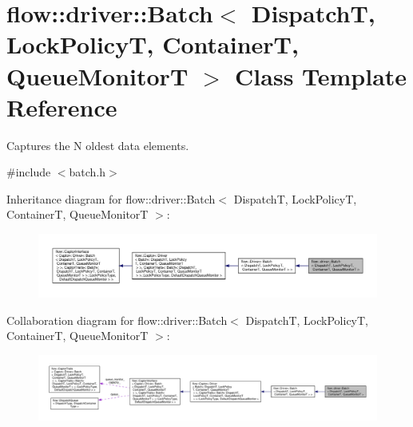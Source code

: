 \hypertarget{classflow_1_1driver_1_1_batch}{}\section{flow\+:\+:driver\+:\+:Batch$<$ DispatchT, Lock\+PolicyT, ContainerT, Queue\+MonitorT $>$ Class Template Reference}
\label{classflow_1_1driver_1_1_batch}


Captures the N oldest data elements.  




{\ttfamily \#include $<$batch.\+h$>$}



Inheritance diagram for flow\+:\+:driver\+:\+:Batch$<$ DispatchT, Lock\+PolicyT, ContainerT, Queue\+MonitorT $>$\+:
\nopagebreak
\begin{figure}[H]
\begin{center}
\leavevmode
\includegraphics[width=350pt]{classflow_1_1driver_1_1_batch__inherit__graph}
\end{center}
\end{figure}


Collaboration diagram for flow\+:\+:driver\+:\+:Batch$<$ DispatchT, Lock\+PolicyT, ContainerT, Queue\+MonitorT $>$\+:
\nopagebreak
\begin{figure}[H]
\begin{center}
\leavevmode
\includegraphics[width=350pt]{classflow_1_1driver_1_1_batch__coll__graph}
\end{center}
\end{figure}
